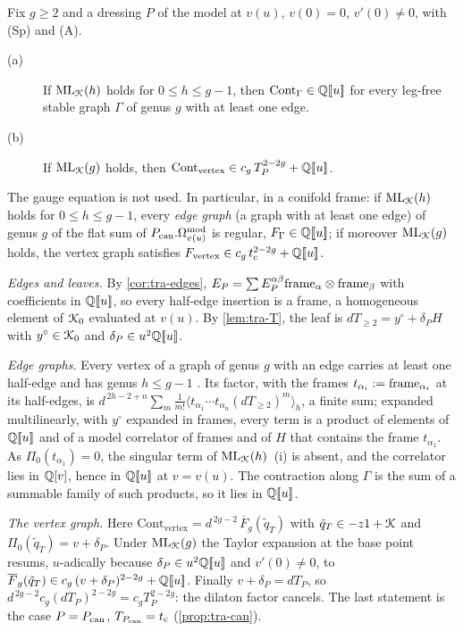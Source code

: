 \begin{thm}
\label{thm:red-main}
Fix $g\geq2$ and a dressing $P$ of the model at $v(u)$, $v(0)=0$, $v'(0)\neq0$, with (Sp) and (A).
\begin{description}
\item[(a)] If $\mathrm{ML}_{\mathcal{K}}(h)$ holds for $0\leq h\leq g-1$, then $\mathrm{Cont}_\Gamma\in\mathbb{Q}[\![ u ]\!]$ for every leg-free stable graph $\Gamma$ of genus $g$ with at least one edge.
\item[(b)] If $\mathrm{ML}_{\mathcal{K}}(g)$ holds, then $\mathrm{Cont}_{\mathrm{vertex}}\in c_g\,T_P^{2-2g}+\mathbb{Q}[\![ u ]\!]$.
\end{description}
The gauge equation is not used. In particular, in a conifold frame: if $\mathrm{ML}_{\mathcal{K}}(h)$ holds for $0\leq h\leq g-1$, every \emph{edge graph} (a graph with at least one edge) of genus $g$ of the flat sum of $P_{\mathrm{can}}.\Omega^{\mathrm{mod}}_{v(u)}$ is regular, $F_\Gamma\in\mathbb{Q}[\![ u ]\!]$; if moreover $\mathrm{ML}_{\mathcal{K}}(g)$ holds, the vertex graph satisfies $F_{\mathrm{vertex}}\in c_g\,t_{\mathrm{c}}^{2-2g}+\mathbb{Q}[\![ u ]\!]$.
\end{thm}

\begin{sketch}
\emph{Edges and leaves.} By \cref{cor:tra-edges}, $E_P=\sum E_P^{\alpha\beta}\mathrm{frame}_\alpha\otimes\mathrm{frame}_\beta$ with coefficients in $\mathbb{Q}[\![ u ]\!]$, so every half-edge insertion is a frame, a homogeneous element of $\mathcal{K}_{0}$ evaluated at $v(u)$. By \cref{lem:tra-T}, the leaf is $dT_{\geq2}=y^\circ+\delta_PH$ with $y^\circ\in\mathcal{K}_{0}$ and $\delta_P\in u^2\mathbb{Q}[\![ u ]\!]$.

\emph{Edge graphs.} Every vertex of a graph of genus $g$ with an edge carries at least one half-edge and has genus $h\leq g-1$ . Its factor, with the frames $t_{\alpha_i}:=\mathrm{frame}_{\alpha_i}$ at its half-edges, is $d^{\,2h-2+n}\sum_m\frac1{m!}\langle t_{\alpha_1}\cdots t_{\alpha_n}(dT_{\geq2})^m\rangle_h$, a finite sum; expanded multilinearly, with $y^\circ$ expanded in frames, every term is a product of elements of $\mathbb{Q}[\![ u ]\!]$ and of a model correlator of frames and of $H$ that contains the frame $t_{\alpha_1}$. As $\Pi_0(t_{\alpha_1})=0$, the singular term of $\mathrm{ML}_{\mathcal{K}}(h)$~(i) is absent, and the correlator lies in $\mathbb{Q}[v]$, hence in $\mathbb{Q}[\![ u ]\!]$ at $v=v(u)$. The contraction along $\Gamma$ is the sum of a summable family of such products, so it lies in $\mathbb{Q}[\![ u ]\!]$.

\emph{The vertex graph.} Here $\mathrm{Cont}_{\mathrm{vertex}}=d^{\,2g-2}\,\overline F_g(\tilde q_T)$ with $\tilde q_T\in-z1+\mathcal{K}$ and $\Pi_0(\tilde q_T)=v+\delta_P$. Under $\mathrm{ML}_{\mathcal{K}}(g)$ the Taylor expansion at the base point resums, $u$-adically because $\delta_P\in u^2\mathbb{Q}[\![ u ]\!]$ and $v'(0)\neq0$, to $\overline F_g(\tilde q_T)\in c_g\,(v+\delta_P)^{2-2g}+\mathbb{Q}[\![ u ]\!]$. Finally $v+\delta_P=dT_P$, so $d^{\,2g-2}c_g(dT_P)^{2-2g}=c_gT_P^{2-2g}$: the dilaton factor cancels. The last statement is the case $P=P_{\mathrm{can}}$, $T_{P_{\mathrm{can}}}=t_{\mathrm{c}}$ (\cref{prop:tra-can}).
\end{sketch}


